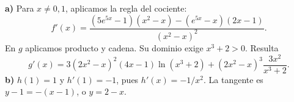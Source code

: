 \textbf{a)} Para $x\ne0,1$, aplicamos la regla del cociente:
\[
f'(x)=\frac{(5e^{5x}-1)(x^2-x)-(e^{5x}-x)(2x-1)}
{(x^2-x)^2}.
\]
En $g$ aplicamos producto y cadena. Su dominio exige
$x^3+2>0$. Resulta
\[
g'(x)=3(2x^2-x)^2(4x-1)\ln(x^3+2)
+(2x^2-x)^3\frac{3x^2}{x^3+2}.
\]
\textbf{b)} $h(1)=1$ y $h'(1)=-1$, pues $h'(x)=-1/x^2$.
La tangente es $y-1=-(x-1)$, o $\boxed{y=2-x}$.
